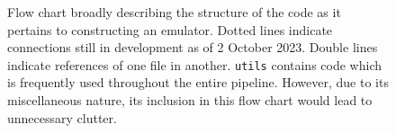 \begin{figure}[ht!]
    \centering
 	
 	\caption[CL Flow Chart]{Flow chart broadly describing the structure
 		of the
 		code as it pertains to constructing an emulator. Dotted lines
 		indicate connections still in development as of 2 October 2023.
 		Double lines indicate references of one file in another.
 		\Verb|utils| contains code which is frequently used throughout
 		the entire pipeline. However, due to its miscellaneous nature, its
 		inclusion in this flow chart would lead to unnecessary clutter.}
 	\label{fig: flow_chart}
\end{figure}
